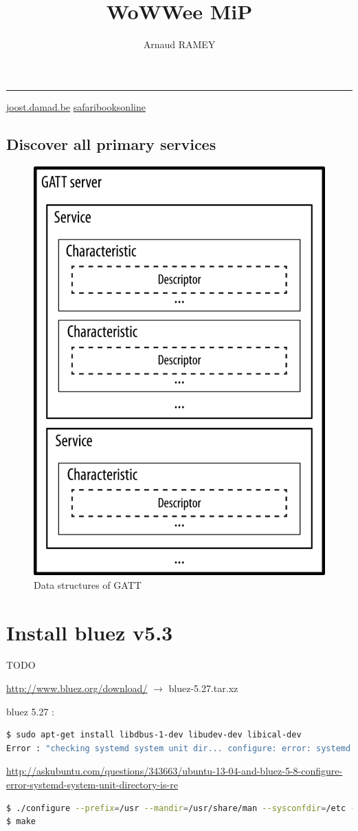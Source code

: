 \documentclass[a4paper,10pt]{article}
\title{WoWWee MiP}
\author{Arnaud RAMEY}
\newcommand{\link}[1] {\href{#1}{#1}}
\begin{document}
\maketitle
\tableofcontents
\hrule
\vspace{5 mm}

\href{http://joost.damad.be/2013/08/experiments-with-bluetooth-low-energy.html}
     {joost.damad.be}
\href{https://www.safaribooksonline.com/library/view/getting-started-with/9781491900550/ch04.html}
 {safaribooksonline}
 
 \subsection{Discover all primary services}
\begin{figure}[!ht]
  \centering
  \includegraphics[width=8 cm]{gatt_structure.png}
  \caption{Data structures of GATT}
\end{figure}


\section{Install bluez v5.3}
TODO

\link{http://www.bluez.org/download/} $\rightarrow$ bluez-5.27.tar.xz

bluez 5.27 : 
\begin{lstlisting}[language=bash]
$ sudo apt-get install libdbus-1-dev libudev-dev libical-dev
Error : "checking systemd system unit dir... configure: error: systemd system unit directory is required"
\end{lstlisting}
\link{http://askubuntu.com/questions/343663/ubuntu-13-04-and-bluez-5-8-configure-error-systemd-system-unit-directory-is-re}
\begin{lstlisting}[language=bash]
$ ./configure --prefix=/usr --mandir=/usr/share/man --sysconfdir=/etc --localstatedir=/var --enable-experimental --with-systemdsystemunitdir=/lib/systemd/system --with-systemduserunitdir=/usr/lib/systemd
$ make
\end{lstlisting}
\end{document}

